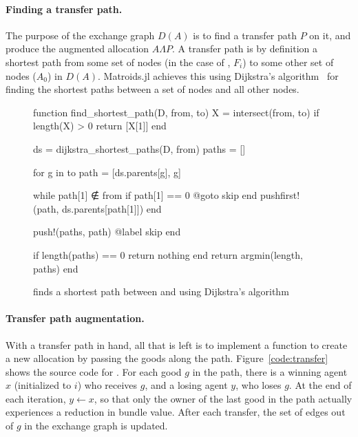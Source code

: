\paragraph{Finding a transfer path.} The purpose of the exchange graph $D(A)$ is to find a transfer path $P$ on it, and produce the augmented allocation $A\Lambda P$. A transfer path is by definition a shortest path from some set of nodes (in the case of , $F_i$) to some other set of nodes ($A_0$) in $D(A)$. Matroids.jl achieves this using Dijkstra's algorithm~\cite{Dijkstra1959} for finding the shortest paths between a set of nodes and all other nodes.

\begin{figure}
\begin{jllisting}

function find_shortest_path(D, from, to)
  X = intersect(from, to)
  if length(X) > 0
    return [X[1]]
  end

  ds = dijkstra_shortest_paths(D, from)
  paths = []

  for g in to
    path = [ds.parents[g], g]
    
    while path[1] ∉ from
      if path[1] == 0 @goto skip end
      pushfirst!(path, ds.parents[path[1]])
    end

    push!(paths, path)
    @label skip
  end

  if length(paths) == 0 return nothing end
  return argmin(length, paths)
end

\end{jllisting}
\caption{ finds a shortest path between  and  using Dijkstra's algorithm}
\label{code:find_shortest_path}
\end{figure}

\paragraph{Transfer path augmentation.} With a transfer path in hand, all that is left is to implement a function to create a new allocation by passing the goods along the path. Figure~\ref{code:transfer} shows the source code for . For each good $g$ in the path, there is a winning agent $x$ (initialized to $i$) who receives $g$, and a losing agent $y$, who loses $g$. At the end of each iteration, $y \leftarrow x$, so that only the owner of the last good in the path actually experiences a reduction in bundle value. After each transfer, the set of edges out of $g$ in the exchange graph is updated.

